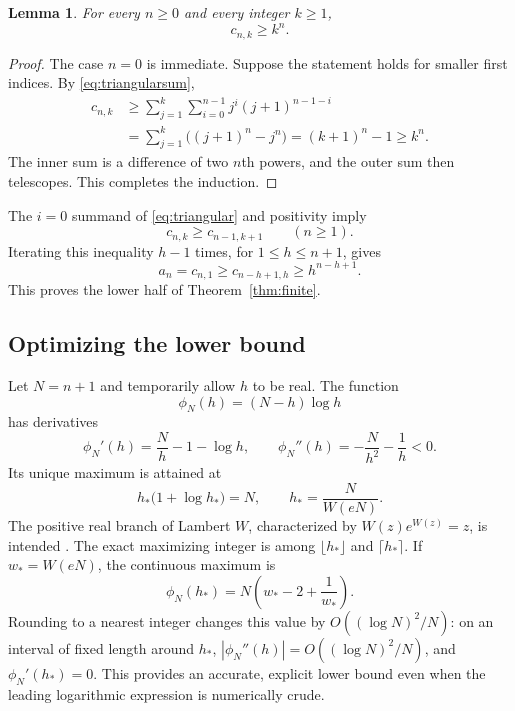 \documentclass[11pt]{article}
\numberwithin{equation}{section}
\newtheorem{lemma}[theorem]{Lemma}
\theoremstyle{definition}
\theoremstyle{remark}
\begin{document}
\begin{lemma}\label{lem:powerlower}
For every $n\ge0$ and every integer $k\ge1$,
\begin{equation}\label{eq:powerlower}
 c_{n,k}\ge k^n.
\end{equation}
\end{lemma}
\begin{proof}
The case $n=0$ is immediate. Suppose the statement holds for smaller
first indices. By \eqref{eq:triangularsum},
\begin{align*}
 c_{n,k}
 &\ge\sum_{j=1}^k\sum_{i=0}^{n-1}j^i(j+1)^{n-1-i}\\
 &=\sum_{j=1}^k\bigl((j+1)^n-j^n\bigr)
  =(k+1)^n-1\ge k^n.
\end{align*}
The inner sum is a difference of two $n$th powers, and the outer sum
then telescopes. This completes the induction.
\end{proof}

The $i=0$ summand of \eqref{eq:triangular} and positivity imply
\[
 c_{n,k}\ge c_{n-1,k+1}\qquad(n\ge1).
\]
Iterating this inequality $h-1$ times, for $1\le h\le n+1$, gives
\begin{equation}\label{eq:pathlower}
 a_n=c_{n,1}\ge c_{n-h+1,h}\ge h^{n-h+1}.
\end{equation}
This proves the lower half of Theorem~\ref{thm:finite}.

\subsection{Optimizing the lower bound}

Let $N=n+1$ and temporarily allow $h$ to be real. The function
\[
 \phi_N(h)=(N-h)\log h
\]
has derivatives
\[
 \phi_N'(h)=\frac Nh-1-\log h,
 \qquad
 \phi_N''(h)=-\frac N{h^2}-\frac1h<0.
\]
Its unique maximum is attained at
\begin{equation}\label{eq:lowerW}
 h_*\bigl(1+\log h_*\bigr)=N,
 \qquad
 h_* =\frac{N}{W(eN)}.
\end{equation}
The positive real branch of Lambert $W$, characterized by
$W(z)e^{W(z)}=z$, is intended \cite{dlmf-w}. The exact maximizing integer
is among $\lfloor h_*\rfloor$ and $\lceil h_*\rceil$.
If $w_*=W(eN)$, the continuous maximum is
\begin{equation}\label{eq:lowerWvalue}
 \phi_N(h_*)=N\left(w_*-2+\frac1{w_*}\right).
\end{equation}
Rounding to a nearest integer changes this value by
$O((\log N)^2/N)$: on an interval of fixed length around $h_*$,
$|\phi_N''(h)|=O((\log N)^2/N)$, and $\phi_N'(h_*)=0$.
This provides an accurate, explicit lower bound even when the leading
logarithmic expression is numerically crude.
\end{document}
